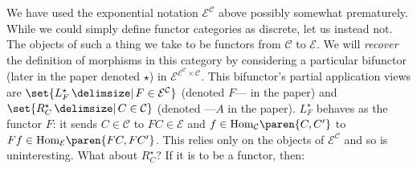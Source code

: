 \documentclass[letterpaper]{article}
\DeclareMathOperator{\mmid}{\mathrel{}\mathclose{}\delimsize|\mathopen{}\mathrel{}}
\newcommand{\Hom}[3]{\textrm{Hom}_{#1}{\paren{#2,#3}}}
\begin{document}
We have used the exponential notation $\mathcal{E}^{\mathcal{C}}$ above
possibly somewhat prematurely.  While we could simply define functor
categories as discrete, let us instead not.  The objects of such a thing we
take to be functors from $\mathcal{C}$ to $\mathcal{E}$.  We will {\em
recover} the definition of morphisms in this category by considering a
particular bifunctor (later in the paper denoted $\star$) in
$\mathcal{E}^{\mathcal{E}^{\mathcal{C}} \times \mathcal{C}}$.  This
bifunctor's partial application views are $\set{L^\star_F \mmid F \in
\mathcal{E}^{\mathcal{C}}}$ (denoted $F \textrm{---}$ in the paper) and
$\set{R^\star_C \mmid C \in \mathcal{C}}$ (denoted $\textrm{---} A$ in the
paper).  $L^\star_F$ behaves as the functor $F$: it sends $C \in
\mathcal{C}$ to $FC \in \mathcal{E}$ and $f \in \Hom{\mathcal{C}}{C}{C'}$ to
$Ff \in \Hom{\mathcal{E}}{FC}{FC'}$.  This relies only on the objects of
$\mathcal{E}^\mathcal{C}$ and so is uninteresting.  What about $R^\star_C$?
If it is to be a functor, then:
%
\end{document}
